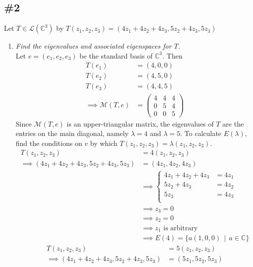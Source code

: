 \documentclass[12pt]{article}
\newcommand{\suchthat}{\, \mid \,}
\begin{document}
\subsection*{\#2}
{Let $T \in \mathcal{L}(\mathbb{C}^3)$ by $T(z_1, z_2, z_3) = (4z_1 + 4z_2 + 4z_3, 5z_2 + 4z_3, 5z_3)$}
\begin{enumerate}[\ \ \it(a)\ \ ]
	\item {\it Find the eigenvalues and associated eigenspaces for $T$.} \\

	\noindent Let $e = (e_1, e_2, e_3)$ be the standard basis of $\mathbb{C}^3$.  Then
	\begin{align*}
		T(e_1) &= (4, 0, 0) \\
		T(e_2) &= (4, 5, 0) \\
		T(e_3) &= (4, 4, 5) \\
		\implies \mathcal{M}(T, e) &= \left(\begin{array}{ccc}
		4 & 4 & 4 \\
		0 & 5 & 4 \\
		0 & 0 & 5
		\end{array}\right)
	\end{align*}
	Since $\mathcal{M}(T, e)$ is an upper-triangular matrix, the eigenvalues of $T$ are the entries on the main diagonal, namely $\lambda = 4$ and $\lambda = 5$.  To calculate $E(\lambda)$, find the conditions on $v$ by which $T(z_1, z_2, z_3) = \lambda (z_1, z_2, z_3)$.
	\begin{align*}
		T(z_1, z_2, z_3) &= 4(z_1, z_2, z_3) \\
		\implies (4z_1 + 4z_2 + 4z_3, 5z_2 + 4z_3, 5z_3) &= (4z_1, 4z_2, 4z_3) \\
		&\implies \left\{\begin{array}{rl}
			4z_1 + 4z_2 + 4z_3 &= 4z_1 \\
			5z_2 + 4z_3 &= 4z_2 \\
			5z_3 &= 4z_3 \\
		\end{array}\right. \\
		&\implies z_3 = 0 \\
		&\implies z_2 = 0 \\
		&\implies z_1 \text{ is arbitrary} \\
		&\implies E(4) = \{a(1, 0, 0) \suchthat a \in \mathbb{C}\}
	\end{align*}
	\begin{align*}
		T(z_1, z_2, z_3) &= 5(z_1, z_2, z_3) \\
		\implies (4z_1 + 4z_2 + 4z_3, 5z_2 + 4z_3, 5z_3) &= (5z_1, 5z_2, 5z_3) \\

\end{align*}
\end{enumerate}
\end{document}
